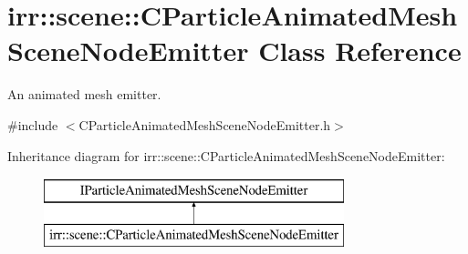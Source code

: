\hypertarget{classirr_1_1scene_1_1_c_particle_animated_mesh_scene_node_emitter}{\section{irr\-:\-:scene\-:\-:C\-Particle\-Animated\-Mesh\-Scene\-Node\-Emitter Class Reference}
\label{classirr_1_1scene_1_1_c_particle_animated_mesh_scene_node_emitter}
}


An animated mesh emitter.  




{\ttfamily \#include $<$C\-Particle\-Animated\-Mesh\-Scene\-Node\-Emitter.\-h$>$}

Inheritance diagram for irr\-:\-:scene\-:\-:C\-Particle\-Animated\-Mesh\-Scene\-Node\-Emitter\-:\begin{figure}[H]
\begin{center}
\leavevmode
\includegraphics[height=2.000000cm]{classirr_1_1scene_1_1_c_particle_animated_mesh_scene_node_emitter}
\end{center}
\end{figure}
